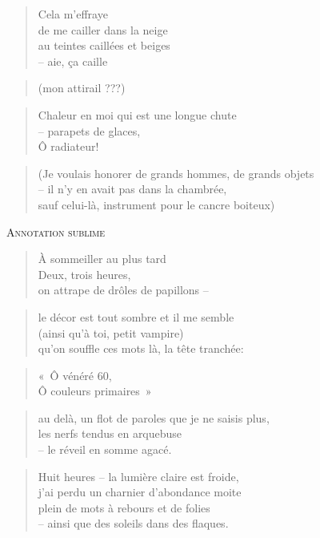   \begin{verse}
    Cela m’effraye\\
    de me cailler dans la neige\\
    au teintes caillées et beiges\\
    -- aie, ça caille
  \end{verse}
  \begin{verse}
    (mon attirail ???)
  \end{verse}
  \begin{verse}
    Chaleur en moi qui est une longue chute\\
    -- parapets de glaces,\\
    Ô radiateur!
  \end{verse}
  \begin{verse}
    (Je voulais honorer de grands hommes, de grands objets\\
    -- il n’y en avait pas dans la chambrée,\\
    sauf celui-là, instrument pour le cancre boiteux)
  \end{verse}
  \begin{center}
    \textsc{Annotation sublime}
  \end{center}
  \begin{verse}
    À sommeiller au plus tard\\
    Deux, trois heures,\\
    on attrape de drôles de papillons --
  \end{verse}
  \begin{verse}
    le décor est tout sombre et il me semble\\
    (ainsi qu’à toi, petit vampire)\\
    qu’on souffle ces mots là, la tête tranchée:
  \end{verse}
  \begin{verse}
    «~Ô vénéré 60,\\
    Ô couleurs primaires~»
  \end{verse}
  \begin{verse}
    au delà, un flot de paroles que je ne saisis plus,\\
    les nerfs tendus en arquebuse\\
    -- le réveil en somme agacé.
  \end{verse}
  \begin{verse}
    Huit heures -- la lumière claire est froide,\\
    j’ai perdu un charnier d’abondance moite\\
    plein de mots à rebours et de folies\\
    -- ainsi que des soleils dans des flaques.
  \end{verse}
